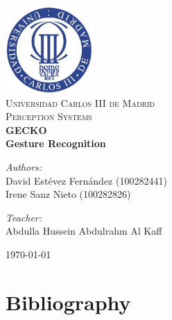 \documentclass{article}
\begin{document}
\begin{center}
\includegraphics[width=0.25\textwidth]{images/uc3m.jpg}\\[2cm]
\textsc{\LARGE Universidad Carlos III de Madrid}\\[0.5cm]
\textsc{\Large Perception Systems}\\[4cm]


{\huge \bfseries{GECKO\\Gesture Recognition}\\[8cm]}


\begin{minipage}{0.55\textwidth}
\begin{flushleft} \large
\emph{Authors:}\\
David Estévez Fernández (100282441)\\
Irene Sanz Nieto (100282826)\\
\end{flushleft}
\end{minipage}
\begin{minipage}{0.4\textwidth}
\begin{flushright} \large
\emph{Teacher:}\\
Abdulla Hussein Abdulrahm Al Kaff
\end{flushright}\end{minipage}\vfill

{\large \today}

\end{center}
%
\newpage
%
\tableofcontents
\newpage

\lhead{}
\chead{}
\pagestyle{fancy}






\section{Bibliography}
\end{document}
